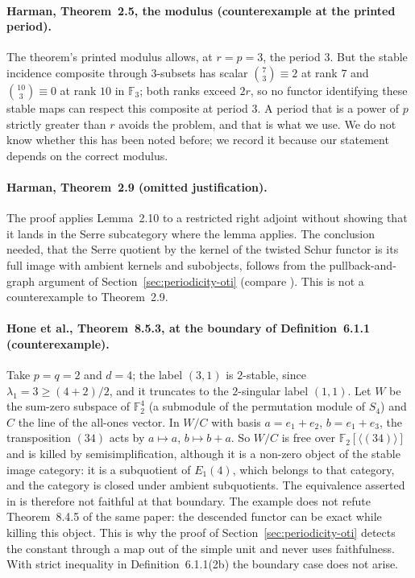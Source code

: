 \paragraph{Harman, Theorem~2.5, the modulus (counterexample at the printed period).}  The
theorem's printed modulus allows, at $r=p=3$, the period $3$.  But the stable incidence
composite through $3$-subsets has scalar $\binom73\equiv2$ at rank $7$ and
$\binom{10}3\equiv0$ at rank $10$ in $\mathbb F_3$; both ranks exceed $2r$, so no functor
identifying these stable maps can respect this composite at period $3$.  A period that is a
power of $p$ strictly greater than $r$ avoids the problem, and that is what we use.  We do not know whether this has been noted before; we record it because our statement
depends on the correct modulus.

\paragraph{Harman, Theorem~2.9 (omitted justification).}  The proof applies Lemma~2.10 to a
restricted right adjoint without showing that it lands in the Serre subcategory where the
lemma applies.  The conclusion needed, that the Serre quotient by the kernel of the twisted
Schur functor is its full image with ambient kernels and subobjects, follows from the
pullback-and-graph argument of Section~\ref{sec:periodicity-oti} (compare
\cite[Lemma~8.5.1]{hone2025}).  This is not a counterexample to Theorem~2.9.

\paragraph{Hone et al., Theorem~8.5.3, at the boundary of Definition~6.1.1
(counterexample).}  Take $p=q=2$ and $d=4$; the label $(3,1)$ is $2$-stable, since
$\lambda_1=3\ge(4+2)/2$, and it truncates to the $2$-singular label $(1,1)$.  Let $W$ be the
sum-zero subspace of $\mathbb F_2^4$ (a submodule of the permutation module of $S_4$) and $C$
the line of the all-ones vector.  In $W/C$ with basis $a=e_1+e_2$, $b=e_1+e_3$, the
transposition $(34)$ acts by $a\mapsto a$, $b\mapsto b+a$.  So $W/C$ is free over
$\mathbb F_2[\langle(34)\rangle]$ and is killed by semisimplification, although it is a
non-zero object of the stable image category: it is a subquotient of $E_1(4)$, which belongs to
that category, and the category is closed under ambient subquotients.  The equivalence asserted in
\cite[Thm.~8.5.3]{hone2025} is therefore not faithful at that boundary.  The example does not
refute Theorem~8.4.5 of the same paper: the descended functor can be exact while killing this
object.  This is why the proof of Section~\ref{sec:periodicity-oti} detects the constant
through a map out of the simple unit and never uses faithfulness.  With strict inequality in
Definition~6.1.1(2b) the boundary case does not arise.

